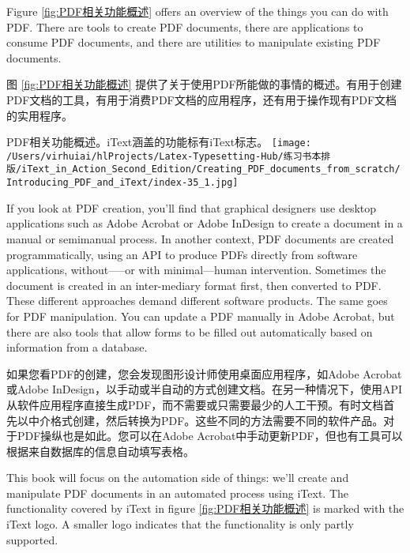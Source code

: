 \documentclass{book}
\begin{document}
Figure \ref{fig:PDF相关功能概述} offers an overview of the things you can do with PDF. There are tools to create PDF documents, there are applications to consume PDF documents, and there are utilities to manipulate existing PDF documents.

图 \ref{fig:PDF相关功能概述} 提供了关于使用PDF所能做的事情的概述。有用于创建PDF文档的工具，有用于消费PDF文档的应用程序，还有用于操作现有PDF文档的实用程序。

\begin{myfigure}{PDF相关功能概述。iText涵盖的功能标有iText标志。\label{fig:PDF相关功能概述}}
\texttt{[image: /Users/virhuiai/hlProjects/Latex-Typesetting-Hub/练习书本排版/iText\_in\_Action\_Second\_Edition/Creating\_PDF\_documents\_from\_scratch/Introducing\_PDF\_and\_iText/index-35\_1.jpg]}
\end{myfigure}


If you look at PDF creation, you’ll find that graphical designers use desktop applications such as Adobe Acrobat or Adobe InDesign to create a document in a manual or semimanual process. In another context, PDF documents are created programmatically, using an API to produce PDFs directly from software applications, without—--or with minimal—human intervention. Sometimes the document is created in an inter-mediary format first, then converted to PDF. These different approaches demand different software products. The same goes for PDF manipulation. You can update a PDF
manually in Adobe Acrobat, but there are also tools that allow forms to be filled out automatically based on information from a database.

如果您看PDF的创建，您会发现图形设计师使用桌面应用程序，如Adobe Acrobat或Adobe InDesign，以手动或半自动的方式创建文档。在另一种情况下，使用API从软件应用程序直接生成PDF，而不需要或只需要最少的人工干预。有时文档首先以中介格式创建，然后转换为PDF。这些不同的方法需要不同的软件产品。对于PDF操纵也是如此。您可以在Adobe Acrobat中手动更新PDF，但也有工具可以根据来自数据库的信息自动填写表格。

This book will focus on the automation side of things: we’ll create and manipulate PDF documents in an automated process using iText. The functionality covered by iText in figure \ref{fig:PDF相关功能概述} is marked with the iText logo. A smaller logo indicates that the functionality is only partly supported.
\end{document}
